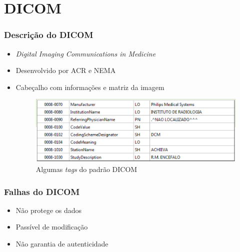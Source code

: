 \documentclass{beamer}
\begin{document}
\section{DICOM}
\begin{frame}
\frametitle{Descrição do DICOM}

\begin{itemize}
\item \textit{Digital Imaging Communications in Medicine}\newline
\item Desenvolvido por ACR e NEMA\newline
\item Cabeçalho com informações e matriz da imagem\newline
\begin{figure}
\includegraphics[scale=.3]{table.png} 
\caption{Algumas \textit{tags} do padrão DICOM}
\end{figure}
\end{itemize}

\end{frame}


\begin{frame}
\frametitle{Falhas do DICOM}

\begin{itemize}
\item Não protege os dados\newline
\item Passível de modificação\newline
\item Não garantia de autenticidade
\end{itemize}

\end{frame}
\end{document}
